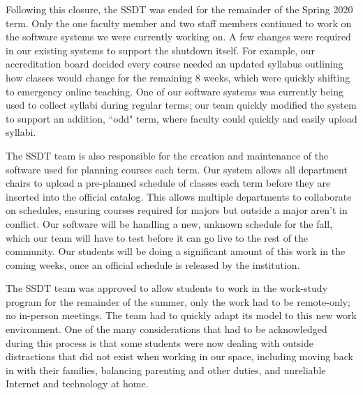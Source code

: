 Following this closure, the SSDT was ended for the remainder of the Spring 2020 term. Only the one faculty member and two staff members continued to work on the software systems we were currently working on. A few changes were required in our existing systems to support the shutdown itself. For example, our accreditation board decided every course needed an updated syllabus outlining how classes would change for the remaining 8 weeks, which were quickly shifting to emergency online teaching. One of our software systems was currently being used to collect syllabi during regular terms; our team quickly modified the system to support an addition, ``odd" term, where faculty could quickly and easily upload syllabi.

The SSDT team is also responsible for the creation and maintenance of the software used for planning courses each term. Our system allows all department chairs to upload a pre-planned schedule of classes each term before they are inserted into the official catalog. This allows multiple departments to collaborate on schedules, ensuring courses required for majors but outside a major aren't in conflict. Our software will be handling a new, unknown schedule for the fall, which our team will have to test before it can go live to the rest of the community. Our students will be doing a significant amount of this work in the coming weeks, once an official schedule is released by the institution.

The SSDT team was approved to allow students to work in the work-study program for the remainder of the summer, only the work had to be remote-only; no in-person meetings. The team had to quickly adapt its model to this new work environment. One of the many considerations that had to be acknowledged during this process is that some students were now dealing with outside distractions that did not exist when working in our space, including moving back in with their families, balancing parenting and other duties, and unreliable Internet and technology at home.

